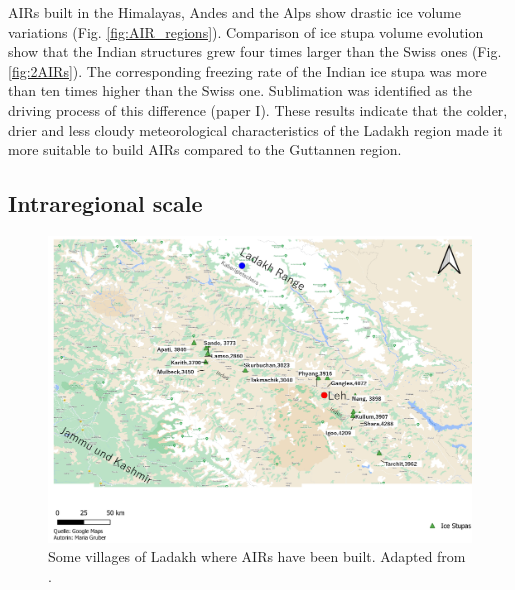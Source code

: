 \ac{AIRs} built in the Himalayas, Andes and the Alps show drastic ice volume variations (Fig. \ref{fig:AIR_regions}).
Comparison of ice stupa volume evolution show that the Indian structures grew four times larger than the Swiss ones (Fig.
\ref{fig:2AIRs}). The corresponding freezing rate of the Indian ice stupa was more than ten times higher than
the Swiss one. Sublimation was identified as the driving process of this difference (paper I). These results indicate that the
colder, drier and less cloudy meteorological characteristics of the Ladakh region made it more suitable to build \ac{AIRs}
compared to the Guttannen region.


\subsection{Intraregional scale}

\begin{figure}[htb]
	\includegraphics[width=\textwidth]{figs/ISC_villages}
	\caption{Some villages of Ladakh where \ac{AIRs} have been built. Adapted from \citet{mariagruberIceStupasLadakh2022}.}
	\label{fig:villages}
\end{figure}

